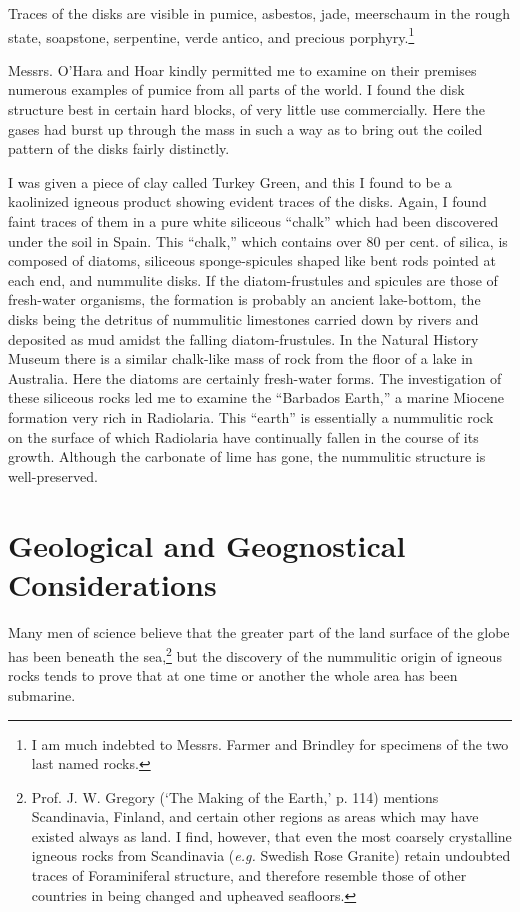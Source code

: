 \documentclass[a4paper, 12pt, oneside]{article}
\begin{document}
Traces of the disks are visible in pumice, asbestos, jade, meerschaum in the rough state, soapstone, serpentine, verde antico, and precious porphyry.\footnote{I am much indebted to Messrs. Farmer and Brindley for specimens of the two last named rocks.}

Messrs. O'Hara and Hoar kindly permitted me to examine on their premises numerous examples of pumice from all parts of the world. I found the disk structure best in certain hard blocks, of very little use commercially. Here the gases had burst up through the mass in such a way as to bring out the coiled pattern of the disks fairly distinctly.

I was given a piece of clay called Turkey Green, and this I found to be a kaolinized igneous product showing evident traces of the disks. Again, I found faint traces of them in a pure white siliceous ``chalk'' which had been discovered under the soil in Spain. This ``chalk,'' which contains over 80 per cent. of silica, is composed of diatoms, siliceous sponge-spicules shaped like bent rods pointed at each end, and nummulite disks. If the diatom-frustules and spicules are those of fresh-water organisms, the formation is probably an ancient lake-bottom, the disks being the detritus of nummulitic limestones carried down by rivers and deposited as mud amidst the falling diatom-frustules. In the Natural History Museum there is a similar chalk-like mass of rock from the floor of a lake in Australia. Here the diatoms are certainly fresh-water forms. The investigation of these siliceous rocks led me to examine the ``Barbados Earth,'' a marine Miocene formation very rich in Radiolaria. This ``earth'' is essentially a nummulitic rock on the surface of which Radiolaria have continually fallen in the course of its growth. Although the carbonate of lime has gone, the nummulitic structure is well-preserved.
\clearpage
\section{Geological and Geognostical Considerations}
\paragraph{}
Many men of science believe that the greater part of the land surface of the globe has been beneath the sea,\footnote{Prof. J. W. Gregory (`The Making of the Earth,' p. 114) mentions Scandinavia, Finland, and certain other regions as areas which may have existed always as land. I find, however, that even the most coarsely crystalline igneous rocks from Scandinavia (\emph{e.g.} Swedish Rose Granite) retain undoubted traces of Foraminiferal structure, and therefore resemble those of other countries in being changed and upheaved seafloors.} but the discovery of the nummulitic origin of igneous rocks tends to prove that at one time or another the whole area has been submarine.
\end{document}

